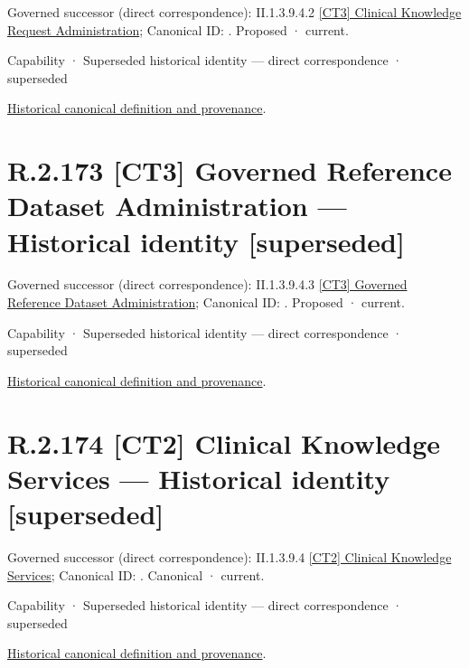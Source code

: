 {\small Governed successor (direct correspondence): II.1.3.9.4.2 \hyperref[element:543c53483a2249d78044c6635b7b7c48]{[CT3] Clinical Knowledge Request Administration}; Canonical ID: \texttt{}. Proposed · current.}\par
\label{element:eb370c01fbdb4d22956d97e9ecd74b57}
{\small Capability · Superseded historical identity — direct correspondence · superseded}\par
\href{../../../../continuum/strategy/capability/eb370c01fbdb4d22956d97e9ecd74b57.md}{Historical canonical definition and provenance}.\par
\section*{R.2.173 [CT3] Governed Reference Dataset Administration — Historical identity [superseded]}
\label{navigation:R.2.173}

{\small Governed successor (direct correspondence): II.1.3.9.4.3 \hyperref[element:682b8684ad9e49d5a5c348a148081607]{[CT3] Governed Reference Dataset Administration}; Canonical ID: \texttt{}. Proposed · current.}\par
\label{element:15d972931ed6447797c30a5ddb71737e}
{\small Capability · Superseded historical identity — direct correspondence · superseded}\par
\href{../../../../continuum/strategy/capability/15d972931ed6447797c30a5ddb71737e.md}{Historical canonical definition and provenance}.\par
\section*{R.2.174 [CT2] Clinical Knowledge Services — Historical identity [superseded]}
\label{navigation:R.2.174}

{\small Governed successor (direct correspondence): II.1.3.9.4 \hyperref[element:bbd2bd21859f40e39963bdbe7a851686]{[CT2] Clinical Knowledge Services}; Canonical ID: \texttt{}. Canonical · current.}\par
\label{element:5b8478b08c3f42c0a3480edb8f0b9ea7}
{\small Capability · Superseded historical identity — direct correspondence · superseded}\par
\href{../../../../continuum/strategy/capability/5b8478b08c3f42c0a3480edb8f0b9ea7.md}{Historical canonical definition and provenance}.\par
